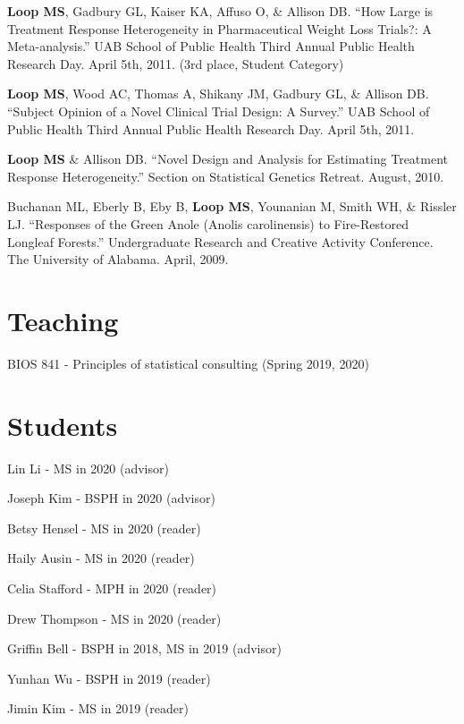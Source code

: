 \documentclass[10pt,letterpaper]{article}
\renewenvironment{itemize}{
  \begin{list}{}{
    \setlength{\leftmargin}{1.5em}
    \setlength{\itemsep}{0.25em}
    \setlength{\parskip}{0pt}
    \setlength{\parsep}{0.25em}
  }
}{
  \end{list}
}
\begin{document}
\begin{itemize}
	\item \textbf{Loop MS}, Gadbury GL, Kaiser KA, Affuso O, \& Allison DB. ``How Large is Treatment Response Heterogeneity in Pharmaceutical Weight Loss Trials?: A Meta-analysis.'' UAB 		School of Public Health Third Annual Public Health Research Day. April 5th, 2011. (3rd place, Student Category)
	\item \textbf{Loop MS}, Wood AC, Thomas A, Shikany JM, Gadbury GL, \& Allison DB. ``Subject Opinion of a Novel Clinical Trial Design: A Survey.'' UAB School of Public Health Third Annual Public Health Research Day. April 5th, 2011.
	\item \textbf{Loop MS} \& Allison DB. ``Novel Design and Analysis for Estimating Treatment Response Heterogeneity.'' Section on Statistical Genetics Retreat. August, 2010.
	\item Buchanan ML, Eberly B, Eby B, \textbf{Loop MS}, Younanian M, Smith WH, \& Rissler LJ. 	``Responses of the Green Anole (Anolis carolinensis) to Fire-Restored Longleaf Forests.'' Undergraduate Research and Creative Activity Conference. The University of 		Alabama. April, 2009.
\end{itemize}

\section*{Teaching}

\begin{itemize}
    \item BIOS 841 - Principles of statistical consulting (Spring 2019, 2020)
\end{itemize}

\section*{Students}

\begin{itemize}
    \item Lin Li - MS in 2020 (advisor)
    \item Joseph Kim - BSPH in 2020 (advisor)
    \item Betsy Hensel - MS in 2020 (reader)
    \item Haily Ausin - MS in 2020 (reader)
    \item Celia Stafford - MPH in 2020 (reader)
    \item Drew Thompson - MS in 2020 (reader)
    \item Griffin Bell - BSPH in 2018, MS in 2019 (advisor)
    \item Yunhan Wu - BSPH in 2019 (reader)
    \item Jimin Kim - MS in 2019 (reader)
\end{itemize}
\end{document}
